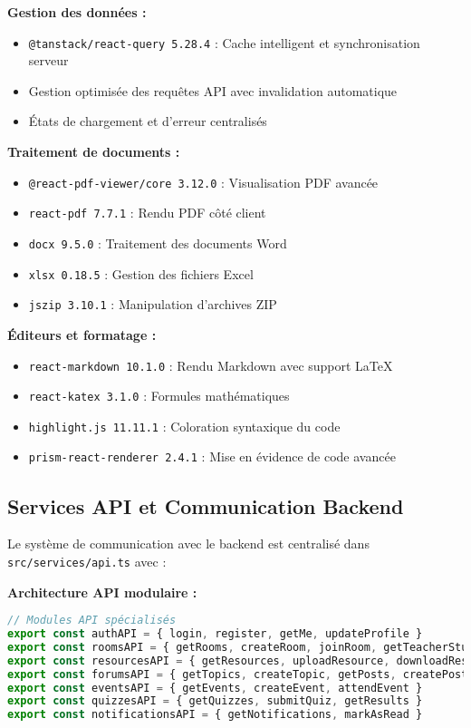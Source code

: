 \documentclass[12pt,a4paper]{article}
\begin{document}
\textbf{Gestion des données :}
\begin{itemize}
    \item \texttt{@tanstack/react-query 5.28.4} : Cache intelligent et synchronisation serveur
    \item Gestion optimisée des requêtes API avec invalidation automatique
    \item États de chargement et d'erreur centralisés
\end{itemize}

\textbf{Traitement de documents :}
\begin{itemize}
    \item \texttt{@react-pdf-viewer/core 3.12.0} : Visualisation PDF avancée
    \item \texttt{react-pdf 7.7.1} : Rendu PDF côté client
    \item \texttt{docx 9.5.0} : Traitement des documents Word
    \item \texttt{xlsx 0.18.5} : Gestion des fichiers Excel
    \item \texttt{jszip 3.10.1} : Manipulation d'archives ZIP
\end{itemize}

\textbf{Éditeurs et formatage :}
\begin{itemize}
    \item \texttt{react-markdown 10.1.0} : Rendu Markdown avec support LaTeX
    \item \texttt{react-katex 3.1.0} : Formules mathématiques
    \item \texttt{highlight.js 11.11.1} : Coloration syntaxique du code
    \item \texttt{prism-react-renderer 2.4.1} : Mise en évidence de code avancée
\end{itemize}

\subsection{Services API et Communication Backend}

Le système de communication avec le backend est centralisé dans \texttt{src/services/api.ts} avec :

\textbf{Architecture API modulaire :}
\begin{lstlisting}[language=JavaScript]
// Modules API spécialisés
export const authAPI = { login, register, getMe, updateProfile }
export const roomsAPI = { getRooms, createRoom, joinRoom, getTeacherStudents }
export const resourcesAPI = { getResources, uploadResource, downloadResource }
export const forumsAPI = { getTopics, createTopic, getPosts, createPost }
export const eventsAPI = { getEvents, createEvent, attendEvent }
export const quizzesAPI = { getQuizzes, submitQuiz, getResults }
export const notificationsAPI = { getNotifications, markAsRead }
\end{lstlisting}
\end{document}
